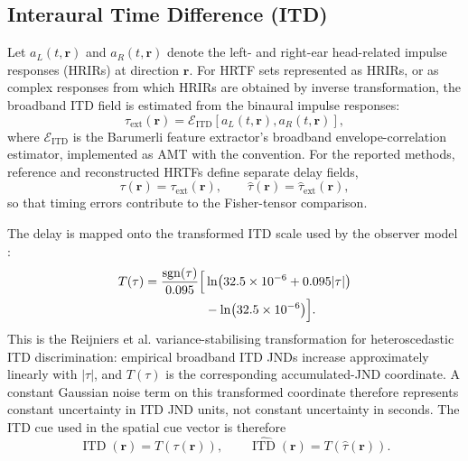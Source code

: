 \documentclass[journal]{IEEEtran}
\begin{document}
\subsection{Interaural Time Difference (ITD)}

Let \(a_L(t,\mathbf{r})\) and \(a_R(t,\mathbf{r})\) denote the left- and right-ear head-related impulse responses (HRIRs) at direction \(\mathbf{r}\). For HRTF sets represented as HRIRs, or as complex responses from which HRIRs are obtained by inverse transformation, the broadband ITD field is estimated from the binaural impulse responses:
\begin{equation}
\tau_{\mathrm{ext}}(\mathbf{r})
=
\mathcal{E}_{\mathrm{ITD}}
\!\left[
 a_L(t,\mathbf{r}),a_R(t,\mathbf{r})
\right],
\end{equation}
where \(\mathcal{E}_{\mathrm{ITD}}\) is the Barumerli feature extractor's broadband envelope-correlation estimator, implemented as AMT  with the  convention. For the reported methods, reference and reconstructed HRTFs define separate delay fields,
\begin{equation}
\tau(\mathbf{r})=\tau_{\mathrm{ext}}(\mathbf{r}),
\qquad
\hat{\tau}(\mathbf{r})=\hat{\tau}_{\mathrm{ext}}(\mathbf{r}),
\end{equation}
so that timing errors contribute to the Fisher-tensor comparison.

\noindent The delay is mapped onto the transformed ITD scale used by the observer model \cite{Reijniers2014,Barumerli2023}:
\begin{equation}
\begin{aligned}
T(\tau)=\frac{\operatorname{sgn}(\tau)}{0.095}
\Bigl[&\ln\!\left(32.5\times10^{-6}+0.095|\tau|\right)\\
&-\ln\!\left(32.5\times10^{-6}\right)\Bigr].
\end{aligned}
\end{equation}
This is the Reijniers et al. variance-stabilising transformation for
heteroscedastic ITD discrimination: empirical broadband ITD JNDs increase
approximately linearly with \(|\tau|\), and \(T(\tau)\) is the corresponding
accumulated-JND coordinate. A constant Gaussian noise term on this transformed
coordinate therefore represents constant uncertainty in ITD JND units, not
constant uncertainty in seconds.
The ITD cue used in the spatial cue vector is therefore
\begin{equation}
\operatorname{ITD}(\mathbf{r}) = T\!\left(\tau(\mathbf{r})\right),
\qquad
\widehat{\operatorname{ITD}}(\mathbf{r}) = T\!\left(\hat{\tau}(\mathbf{r})\right).
\end{equation}
\end{document}
